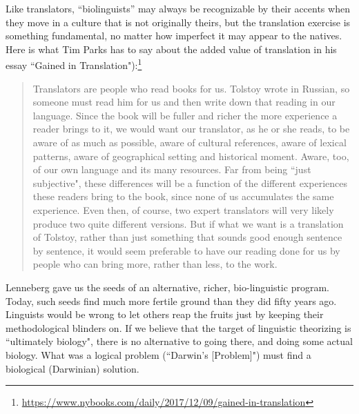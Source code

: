 Like translators, ``biolinguists'' may always be recognizable by their accents when they move in a culture that is not originally theirs, but the translation exercise is something fundamental, no matter how imperfect it may appear to the natives. Here is what Tim Parks has to say about the added value of translation in his essay ``Gained in Translation"):\footnote{\url{https://www.nybooks.com/daily/2017/12/09/gained-in-translation}}
\begin{quote}
Translators are people who read books for us. Tolstoy wrote in Russian, so someone must read him for us and then write down that reading in our language. Since the book will be fuller and richer the more experience a reader brings to it, we would want our translator, as he or she reads, to be aware of as much as possible, aware of cultural references, aware of lexical patterns, aware of geographical setting and historical moment. Aware, too, of our own language and its many resources. Far from being ``just subjective", these differences will be a function of the different experiences these readers bring to the book, since none of us accumulates the same experience. Even then, of course, two expert translators will very likely produce two quite different versions. But if what we want is a translation of Tolstoy, rather than just something that sounds good enough sentence by sentence, it would seem preferable to have our reading done for us by people who can bring more, rather than less, to the work.
\end{quote}

Lenneberg gave us the seeds of an alternative, richer, bio-linguistic program. Today, such seeds find much more fertile ground than they did fifty years ago. Linguists would be wrong to let others reap the fruits just by keeping their methodological blinders on. If we believe that the target of linguistic theorizing is ``ultimately biology", there is no alternative to going there, and doing some actual biology. What was a logical problem (``Darwin's [Problem]") must find a biological (Darwinian) solution.

